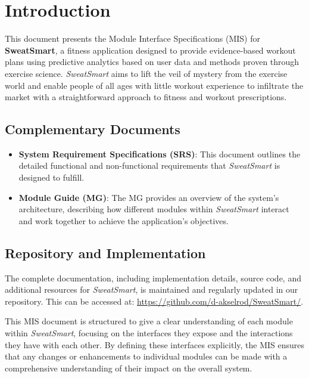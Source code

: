 \documentclass[12pt, titlepage]{article}
\begin{document}
\newpage


\section{Introduction}

This document presents the Module Interface Specifications (MIS) for \textbf{SweatSmart}, a fitness application designed to provide evidence-based workout plans using predictive analytics based on user data and methods proven through exercise science. \textit{SweatSmart} aims to lift the veil of mystery from the exercise world and enable people of all ages with little workout experience to infiltrate the market with a straightforward approach to fitness and workout prescriptions.

\subsection{Complementary Documents}
\begin{itemize}
    \item \textbf{System Requirement Specifications (SRS)}: This document outlines the detailed functional and non-functional requirements that \textit{SweatSmart} is designed to fulfill.
    \item \textbf{Module Guide (MG)}: The MG provides an overview of the system’s architecture, describing how different modules within \textit{SweatSmart} interact and work together to achieve the application's objectives.
\end{itemize}

\subsection{Repository and Implementation}
The complete documentation, including implementation details, source code, and additional resources for \textit{SweatSmart}, is maintained and regularly updated in our repository. This can be accessed at: \url{https://github.com/d-akselrod/SweatSmart/}.

This MIS document is structured to give a clear understanding of each module within \textit{SweatSmart}, focusing on the interfaces they expose and the interactions they have with each other. By defining these interfaces explicitly, the MIS ensures that any changes or enhancements to individual modules can be made with a comprehensive understanding of their impact on the overall system.
\end{document}
